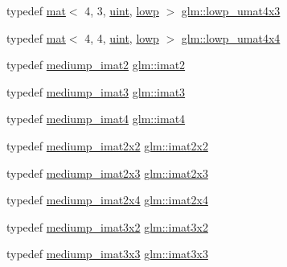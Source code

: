\begin{DoxyCompactItemize}
\item 
typedef \hyperlink{structglm_1_1mat}{mat}$<$ 4, 3, \hyperlink{group__core__precision_ga4fd29415871152bfb5abd588334147c8}{uint}, \hyperlink{namespaceglm_a36ed105b07c7746804d7fdc7cc90ff25ae161af3fc695e696ce3bf69f7332bc2d}{lowp} $>$ \hyperlink{group__gtc__matrix__integer_ga5eb6bfe468dd615e0a78fb9f3ca813c6}{glm\+::lowp\+\_\+umat4x3}
\item 
typedef \hyperlink{structglm_1_1mat}{mat}$<$ 4, 4, \hyperlink{group__core__precision_ga4fd29415871152bfb5abd588334147c8}{uint}, \hyperlink{namespaceglm_a36ed105b07c7746804d7fdc7cc90ff25ae161af3fc695e696ce3bf69f7332bc2d}{lowp} $>$ \hyperlink{group__gtc__matrix__integer_ga4386ea62144a0c737b4789ed87df4177}{glm\+::lowp\+\_\+umat4x4}
\item 
typedef \hyperlink{group__gtc__matrix__integer_ga74e065ab9524e6b7bd5a84cffb758e71}{mediump\+\_\+imat2} \hyperlink{group__gtc__matrix__integer_ga77a581b3366fb63fc72f8f20830003e0}{glm\+::imat2}
\item 
typedef \hyperlink{group__gtc__matrix__integer_gac6ab7a5cfe157ba8deb79a7691ad8263}{mediump\+\_\+imat3} \hyperlink{group__gtc__matrix__integer_ga45481922dd07a3a8e23758286311ee97}{glm\+::imat3}
\item 
typedef \hyperlink{group__gtc__matrix__integer_ga3ce415f7039ec7f1ad5bffa14d226e80}{mediump\+\_\+imat4} \hyperlink{group__gtc__matrix__integer_ga40fc5c5e0b07543497aa1c314891544a}{glm\+::imat4}
\item 
typedef \hyperlink{group__gtc__matrix__integer_gafe326375aa42c0abbe571d376f4cbd95}{mediump\+\_\+imat2x2} \hyperlink{group__gtc__matrix__integer_gaf7f44f44d966377666d41ed059524732}{glm\+::imat2x2}
\item 
typedef \hyperlink{group__gtc__matrix__integer_ga1e2d944bde5dfe9fe49824c4c3457e30}{mediump\+\_\+imat2x3} \hyperlink{group__gtc__matrix__integer_ga143bc5177bac9991d84b70da03952516}{glm\+::imat2x3}
\item 
typedef \hyperlink{group__gtc__matrix__integer_gabc256c695f6fe794f809f2d1ee667d6e}{mediump\+\_\+imat2x4} \hyperlink{group__gtc__matrix__integer_gafe2d058e164fd1badace451ffcf4ae46}{glm\+::imat2x4}
\item 
typedef \hyperlink{group__gtc__matrix__integer_gae3f0a14fb81eb2edc0caf5b131adb969}{mediump\+\_\+imat3x2} \hyperlink{group__gtc__matrix__integer_ga04deef94cdfdd3b3b2706e10a32ef7f3}{glm\+::imat3x2}
\item 
typedef \hyperlink{group__gtc__matrix__integer_ga1304a2da9c3f5937aa8c4684d638d09c}{mediump\+\_\+imat3x3} \hyperlink{group__gtc__matrix__integer_gaeff9ef8f56cccc828d6b897923e75402}{glm\+::imat3x3}

\end{DoxyCompactItemize}
